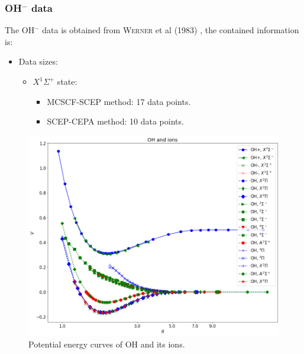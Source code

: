 \documentclass[12pt]{article}
\begin{document}
\subsubsection{OH$^-$ data}
The OH$^-$ data is obtained from \textsc{Werner} et al (1983) \cite{idx171}, the contained information is:
\begin{itemize}
    \item Data sizes:
    \begin{itemize}
        \item $X^1\Sigma^+$ state:
        \begin{itemize}
            \item MCSCF-SCEP method: 17 data points.
            \item SCEP-CEPA method: 10 data points.
        \end{itemize}
    \end{itemize}
\end{itemize}
\begin{figure}[h]
    \centering
    \includegraphics[scale=0.55]{img/OH_and_ions.png}
    \caption{Potential energy curves of OH and its ions.}
    \label{fig:oh}
\end{figure}
\end{document}
